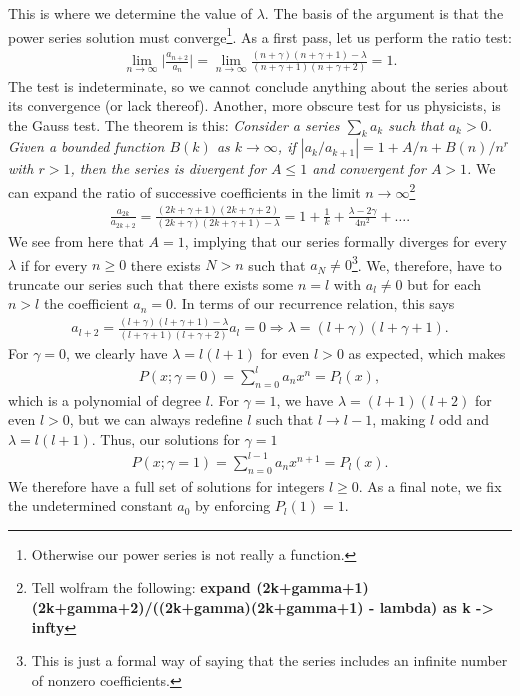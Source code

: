 This is where we determine the value of $\lambda$.
The basis of the argument is that the power series solution must converge\footnote{Otherwise our power series is not really a function.}.
As a first pass, let us perform the ratio test:
\begin{eqnarray}
    \lim_{n \rightarrow \infty} \Big| \frac{a_{n+2}}{a_{n}} \Big| = \lim_{n \rightarrow \infty} \frac{(n+\gamma)(n+\gamma+1) - \lambda}{(n+\gamma+1)(n+\gamma+2)} = 1
.\end{eqnarray}
The test is indeterminate, so we cannot conclude anything about the series about its convergence (or lack thereof).
Another, more obscure test for us physicists, is the Gauss test.
The theorem is this: \textit{Consider a series $\sum_{k} a_{k}$ such that $a_{k} > 0$. Given a bounded function $B(k)$ as $k \rightarrow \infty$, if $|a_{k}/a_{k+1}| = 1 + A/n + B(n)/n^{r}$ with $r > 1$, then the series is divergent for $A \leq 1$ and convergent for $A > 1$.}
We can expand the ratio of successive coefficients in the limit $n \rightarrow \infty$\footnote{Tell wolfram the following: \textbf{expand (2k+gamma+1)(2k+gamma+2)/((2k+gamma)(2k+gamma+1) - lambda) as k -> infty}}
\begin{eqnarray}
    \frac{a_{2k}}{a_{2k+2}} = \frac{(2k+\gamma+1)(2k+\gamma+2)}{(2k+\gamma)(2k+\gamma+1) - \lambda} = 1 + \frac{1}{k} + \frac{\lambda - 2\gamma}{4n^2} + \ldots
.\end{eqnarray}
We see from here that $A = 1$, implying that our series formally diverges for every $\lambda$ if for every $n \geq 0$ there exists $N > n$ such that $a_{N} \ne 0$\footnote{This is just a formal way of saying that the series includes an infinite number of nonzero coefficients.}.
We, therefore, have to truncate our series such that there exists some $n=l$ with $a_{l} \ne 0$ but for each $n > l$ the coefficient $a_{n} = 0$.
In terms of our recurrence relation, this says
\begin{eqnarray}
    a_{l+2} = \frac{(l+\gamma)(l+\gamma+1) - \lambda}{(l+\gamma+1)(l+\gamma+2)} a_{l} = 0 \Rightarrow \lambda = (l+\gamma)(l+\gamma+1)
.\end{eqnarray}
For $\gamma=0$, we clearly have $\lambda = l(l+1)$ for even $l > 0$ as expected, which makes
\begin{eqnarray}
    P(x;\gamma=0) = \sum_{n=0}^{l} a_{n} x^{n} = P_{l}(x)
,\end{eqnarray}
which is a polynomial of degree $l$.
For $\gamma = 1$, we have $\lambda = (l+1)(l+2)$ for even $l > 0$, but we can always redefine $l$ such that $l \rightarrow l - 1$, making $l$ odd and $\lambda = l(l+1)$.
Thus, our solutions for $\gamma = 1$
\begin{eqnarray}
    P(x;\gamma=1) = \sum_{n=0}^{l-1} a_{n} x^{n+1} = P_{l}(x)
.\end{eqnarray}
We therefore have a full set of solutions for integers $l \geq 0$.
As a final note, we fix the undetermined constant $a_0$ by enforcing $P_{l}(1) = 1$.

